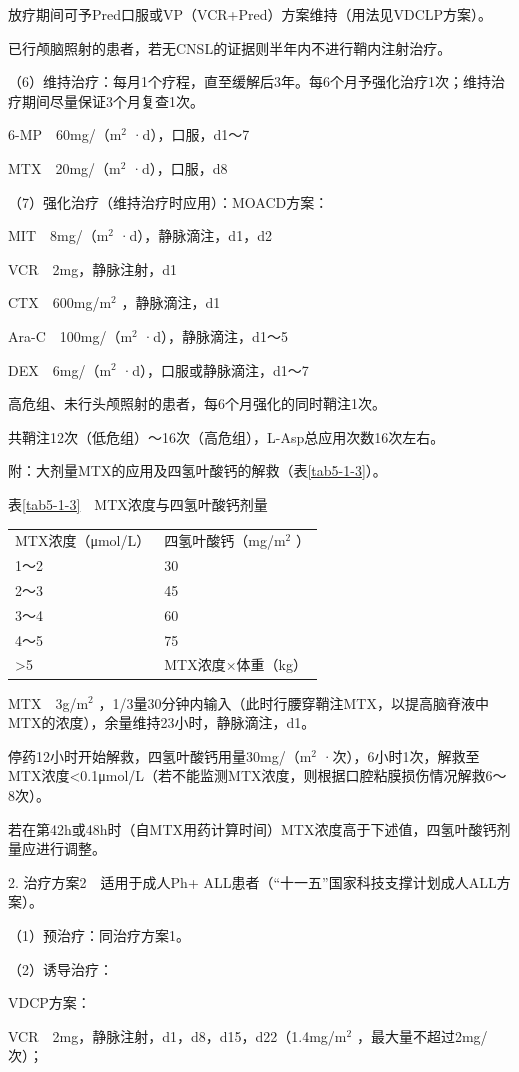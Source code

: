 放疗期间可予Pred口服或VP（VCR+Pred）方案维持（用法见VDCLP方案）。

已行颅脑照射的患者，若无CNSL的证据则半年内不进行鞘内注射治疗。

（6）维持治疗：每月1个疗程，直至缓解后3年。每6个月予强化治疗1次；维持治疗期间尽量保证3个月复查1次。

6-MP　60mg/（m$^2$ ·d），口服，d1～7

MTX　20mg/（m$^2$ ·d），口服，d8

（7）强化治疗（维持治疗时应用）：MOACD方案：

MIT　8mg/（m$^2$ ·d），静脉滴注，d1，d2

VCR　2mg，静脉注射，d1

CTX　600mg/m$^2$ ，静脉滴注，d1

Ara-C　100mg/（m$^2$ ·d），静脉滴注，d1～5

DEX　6mg/（m$^2$ ·d），口服或静脉滴注，d1～7

高危组、未行头颅照射的患者，每6个月强化的同时鞘注1次。

共鞘注12次（低危组）～16次（高危组），L-Asp总应用次数16次左右。

附：大剂量MTX的应用及四氢叶酸钙的解救（表\ref{tab5-1-3}）。

表\ref{tab5-1-3}　MTX浓度与四氢叶酸钙剂量

\begin{longtable}[]{@{}ll@{}}
\toprule
\endhead
MTX浓度（μmol/L） & 四氢叶酸钙（mg/m$^2$ ）\tabularnewline
1～2 & 30\tabularnewline
2～3 & 45\tabularnewline
3～4 & 60\tabularnewline
4～5 & 75\tabularnewline
\textgreater{}5 & MTX浓度×体重（kg）\tabularnewline
\bottomrule
\end{longtable}

MTX　3g/m$^2$
，1/3量30分钟内输入（此时行腰穿鞘注MTX，以提高脑脊液中MTX的浓度），余量维持23小时，静脉滴注，d1。

停药12小时开始解救，四氢叶酸钙用量30mg/（m$^2$
·次），6小时1次，解救至MTX浓度<0.1μmol/L（若不能监测MTX浓度，则根据口腔粘膜损伤情况解救6～8次）。

若在第42h或48h时（自MTX用药计算时间）MTX浓度高于下述值，四氢叶酸钙剂量应进行调整。

2. 治疗方案2　适用于成人Ph{+}
ALL患者（“十一五”国家科技支撑计划成人ALL方案）。

（1）预治疗：同治疗方案1。

（2）诱导治疗：

VDCP方案：

VCR　2mg，静脉注射，d1，d8，d15，d22（1.4mg/m$^2$
，最大量不超过2mg/次）；

